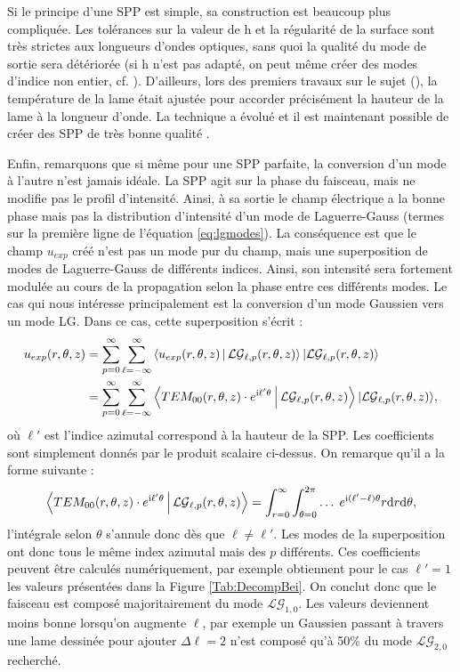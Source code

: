 Si le principe d'une SPP est simple, sa construction est beaucoup plus compliquée. Les tolérances sur la valeur de h et la régularité de la surface sont très strictes aux longueurs d'ondes optiques, sans quoi la qualité du mode de sortie sera détériorée (si h n'est pas adapté, on peut même créer des modes d'indice non entier, cf. ). D'ailleurs, lors des premiers travaux sur le sujet (), la température de la lame était ajustée pour accorder précisément la hauteur de la lame à la longueur d'onde. La technique a évolué et il est maintenant possible de créer des SPP de très bonne qualité .

Enfin, remarquons que si même pour une SPP parfaite, la conversion d'un mode à l'autre n'est jamais idéale. La SPP agit sur la phase du faisceau, mais ne modifie pas le profil d'intensité. Ainsi, à sa sortie le champ électrique a la bonne phase mais pas la distribution d'intensité d'un mode de Laguerre-Gauss (termes sur la première ligne de l'équation \ref{eq:lgmodes}). La conséquence est que le champ $u_{exp}$ créé n'est pas un mode pur du champ, mais une superposition de modes de Laguerre-Gauss de différents indices. Ainsi, son intensité sera fortement modulée au cours de la propagation selon la phase entre ces différents modes. Le cas qui nous intéresse principalement est la conversion d'un mode Gaussien vers un mode LG. Dans ce cas, cette superposition s'écrit :
\begin{align*}
u_{exp}(r,\theta,z) &= \sum_{p=0}^\infty\sum_{\ell=-\infty}^\infty{\Braket{u_{exp}(r,\theta,z)|\mathcal{LG}_{\ell,p}(r,\theta,z)} \ket{\mathcal{LG}_{\ell,p}(r,\theta,z)}}\\
&=\sum_{p=0}^\infty\sum_{\ell=-\infty}^\infty{\Braket{TEM_{00}(r,\theta,z)\cdot e^{\mathrm{i}\ell'\theta}|\mathcal{LG}_{\ell,p}(r,\theta,z)} \ket{\mathcal{LG}_{\ell,p}(r,\theta,z)}},
\end{align*}
où $\ell'$ est l'indice azimutal correspond à la hauteur de la SPP. Les coefficients sont simplement donnés par le produit scalaire ci-dessus. On remarque qu'il a la forme suivante :
\begin{equation*}
\Braket{TEM_{00}(r,\theta,z)\cdot e^{\mathrm{i}\ell'\theta}|\mathcal{LG}_{\ell,p}(r,\theta,z)} = \int_{r=0}^\infty\int_{\theta=0}^{2\pi}{\ldots \; e^{\mathrm{i}(\ell'-\ell)\theta}r\mathrm{d} r \mathrm{d} \theta},
\end{equation*}
l'intégrale selon $\theta$ s'annule donc dès que $\ell\neq\ell'$. Les modes de la superposition ont donc tous le même index azimutal mais des $p$ différents. Ces coefficients peuvent être calculés numériquement, par exemple  obtiennent pour le cas $\ell' = 1$ les valeurs présentées dans la Figure \ref{Tab:DecompBei}. On conclut donc que le faisceau est composé majoritairement du mode $\mathcal{LG}_{1,0}$. Les valeurs deviennent moins bonne lorsqu'on augmente $\ell$, par exemple un Gaussien passant à travers une lame dessinée pour ajouter $\Delta\ell =2$ n'est composé qu'à 50\% du mode $\mathcal{LG}_{2,0}$ recherché.
